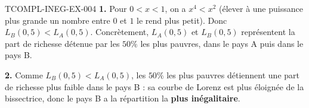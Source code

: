 \begin{corrige}{TCOMPL-INEG-EX-004}
\textbf{1.} Pour $0<x<1$, on a $x^4 < x^2$ (élever à une puissance plus grande un nombre entre $0$ et $1$ le rend plus petit). Donc $L_B(0{,}5) < L_A(0{,}5)$. Concrètement, $L_A(0{,}5)$ et $L_B(0{,}5)$ représentent la part de richesse détenue par les $50\%$ les plus pauvres, dans le pays A puis dans le pays B.

\textbf{2.} Comme $L_B(0{,}5) < L_A(0{,}5)$, les $50\%$ les plus pauvres détiennent une part de richesse plus faible dans le pays B : sa courbe de Lorenz est plus éloignée de la bissectrice, donc le pays B a la répartition la \textbf{plus inégalitaire}.
\end{corrige}
